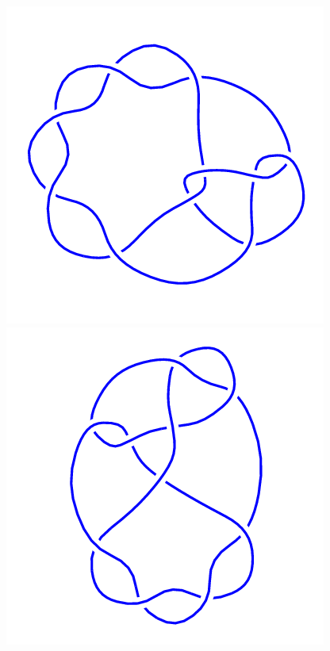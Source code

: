 \begin{figure}[H]
\begin{minipage}[b]{.18\linewidth}
	\end{minipage}
	\begin{minipage}[b]{.18\linewidth}
		\centering
		\includegraphics[width=\linewidth]{../data/10_124.png}
	\end{minipage}
	\begin{minipage}[b]{.18\linewidth}
		\centering
		\includegraphics[width=\linewidth]{../data/10_125.png}

\end{minipage}
\end{figure}
